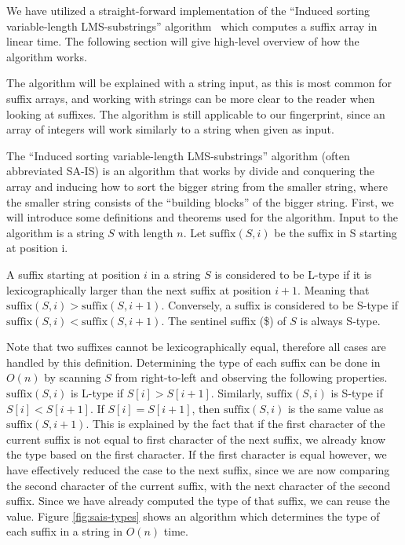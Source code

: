 We have utilized a straight-forward implementation of the ``Induced sorting
variable-length LMS-substrings'' algorithm~\cite{LinearTimeSuffixArraySAIS} which computes
a suffix array in linear time. The following section will give high-level overview of how
the algorithm works. 

The algorithm will be explained with a string input, as this is most common for suffix
arrays, and working with strings can be more clear to the reader when looking at suffixes.
The algorithm is still applicable to our fingerprint, since an array of integers will work
similarly to a string when given as input.

The ``Induced sorting variable-length LMS-substrings'' algorithm (often abbreviated SA-IS)
is an algorithm that works by divide and conquering the array and inducing how to sort the
bigger string from the smaller string, where the smaller string consists of the ``building
blocks'' of the bigger string. First, we will introduce some definitions and theorems used
for the algorithm. Input to the algorithm is a string $S$ with length $n$. Let
$\text{suffix}(S, i)$ be the suffix in S starting at position i.

\begin{definition} A suffix starting at position $i$ in a
    string $S$ is considered to be L-type if it is lexicographically larger than the next
    suffix at position $i + 1$. Meaning that $\text{suffix}(S, i) > \text{suffix}(S,
    i+1)$. Conversely, a suffix is considered to be S-type if $\text{suffix}(S, i) <
    \text{suffix}(S, i+1)$. The sentinel suffix (\$) of $S$ is always S-type.
\end{definition}

Note that two suffixes cannot be lexicographically equal, therefore all cases are handled
by this definition. Determining the type of each suffix can be done in $O(n)$ by scanning
$S$ from right-to-left and observing the following properties. $\text{suffix}(S, i)$ is
L-type if $S[i] > S[i + 1]$. Similarly, $\text{suffix}(S, i)$ is S-type if $S[i] < S[i +
1]$. If $S[i] = S[i + 1]$, then $\text{suffix}(S, i)$ is the same value as
$\text{suffix}(S, i + 1)$. This is explained by the fact that if the first character of
the current suffix is not equal to first character of the next suffix, we already know the
type based on the first character. If the first character is equal however, we have
effectively reduced the case to the next suffix, since we are now comparing the second
character of the current suffix, with the next character of the second suffix. Since we
have already computed the type of that suffix, we can reuse the value. Figure
\ref{fig:sais-types} shows an algorithm which determines the type of each suffix in a
string in $O(n)$ time.


